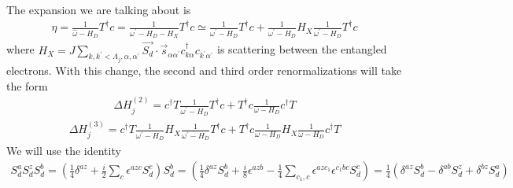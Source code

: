 The expansion we are talking about is
\begin{equation}\begin{aligned}
	\eta = \frac{1}{\hat \omega - H_D}T^\dagger c = \frac{1}{\omega^\prime - H_D - H_X}T^\dagger c \simeq \frac{1}{\omega^\prime - H_D}T^\dagger c + \frac{1}{\omega^\prime - H_D}H_X \frac{1}{\omega^\prime - H_D} T^\dagger c
\end{aligned}\end{equation}
where \(H_X = J \sum_{k,k^\prime < \Lambda_j, \alpha,\alpha^\prime}\vec{S_d}\cdot\vec{s}_{\alpha \alpha^\prime}c^\dagger_{k\alpha}c_{k^\prime\alpha^\prime}\) is scattering between the entangled electrons.
With this change, the second and third order renormalizations will take the form
\begin{equation}\begin{aligned}
	\Delta H^{(2)}_j = c^\dagger T \frac{1}{\omega^\prime - H_D}T^\dagger c + T^\dagger c \frac{1}{\omega - H_D}c^\dagger T
\end{aligned}\end{equation}
\begin{equation}\begin{aligned}
	\Delta H^{(3)}_j = c^\dagger T \frac{1}{\omega^\prime - H_D} H_X \frac{1}{\omega^\prime - H_D} T^\dagger c + T^\dagger c \frac{1}{\omega - H_D} H_X \frac{1}{\omega - H_D} c^\dagger T
\end{aligned}\end{equation}
We will use the identity
\begin{equation}\begin{aligned}
	\label{identity_SSS}
	S_d^a S_d^z S_d^b = \left(\frac{1}{4}\delta^{az} + \frac{i}{2}\sum_c \epsilon^{azc}S_d^c\right)S_d^b = \left(\frac{1}{4}\delta^{az}S_d^b + \frac{i}{8} \epsilon^{azb}  - \frac{1}{4}\sum_{c_1,c} \epsilon^{azc_1} \epsilon^{c_1 b c} S_d^c\right) = \frac{1}{4}\left(\delta^{az}S_d^b - \delta^{ab}S_d^z + \delta^{bz}S_d^a\right)
\end{aligned}\end{equation}

